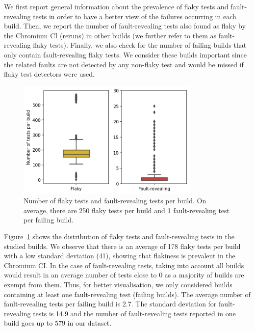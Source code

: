 We first report general information about the prevalence of flaky tests and fault-revealing tests in order to have a better view of the failures occurring in each build. Then, we report the number of fault-revealing tests also found as flaky by the Chromium CI (reruns) in other builds (we further refer to them as fault-revealing flaky tests). Finally, we also check for the number of failing builds that only contain fault-revealing flaky tests. We consider these builds important since the related faults are not detected by any non-flaky test and would be missed if flaky test detectors were used.

\begin{figure}[!htbp]
\centering
\includegraphics[width=0.8\textwidth]{figures/chromium/testsPerBuild.png}
\caption{Number of flaky tests and fault-revealing tests per build. On average, there are 250 flaky tests per build and 1 fault-revealing test per failing build.}
\label{fig:testsPerBuild}
\end{figure}

Figure~\ref{fig:testsPerBuild} shows the distribution of flaky tests and fault-revealing tests in the studied builds. We observe that there is an average of 178 flaky tests per build with a low standard deviation (41), showing that flakiness is prevalent in the Chromium CI. In the case of fault-revealing tests, taking into account all builds would result in an average number of tests close to 0 as a majority of builds are exempt from them. Thus, for better visualisation, we only considered builds containing at least one fault-revealing test (\ie failing builds). The average number of fault-revealing tests per failing build is 2.7.
The standard deviation for fault-revealing tests is 14.9 and the number of fault-revealing tests reported in one build goes up to 579 in our dataset.

